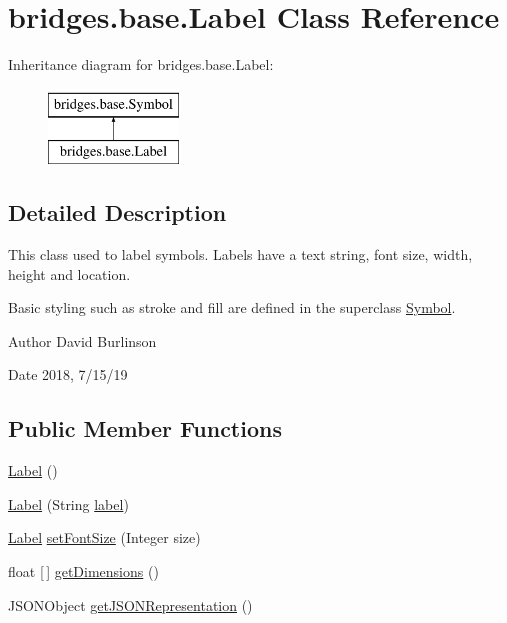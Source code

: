 \hypertarget{classbridges_1_1base_1_1_label}{}\section{bridges.\+base.\+Label Class Reference}
\label{classbridges_1_1base_1_1_label}
Inheritance diagram for bridges.\+base.\+Label\+:\begin{figure}[H]
\begin{center}
\leavevmode
\includegraphics[height=2.000000cm]{classbridges_1_1base_1_1_label}
\end{center}
\end{figure}


\subsection{Detailed Description}
This class used to label symbols. Labels have a text string, font size, width, height and location. 

Basic styling such as stroke and fill are defined in the superclass \mbox{\hyperlink{classbridges_1_1base_1_1_symbol}{Symbol}}.

\begin{DoxyAuthor}{Author}
David Burlinson 
\end{DoxyAuthor}
\begin{DoxyDate}{Date}
2018, 7/15/19 
\end{DoxyDate}
\subsection*{Public Member Functions}
\begin{DoxyCompactItemize}
\item 
\mbox{\hyperlink{classbridges_1_1base_1_1_label_adaed1c29dc02eb0f77d772b256b9eae4}{Label}} ()
\item 
\mbox{\hyperlink{classbridges_1_1base_1_1_label_a0ffb2cdafae3f2c21e0925f2fe23df87}{Label}} (String \mbox{\hyperlink{classbridges_1_1base_1_1_symbol_ad2adcc82e6a96c2f3c465702502655e9}{label}})
\item 
\mbox{\hyperlink{classbridges_1_1base_1_1_label}{Label}} \mbox{\hyperlink{classbridges_1_1base_1_1_label_ab5f2d60e519db2499f326c4ccb967b25}{set\+Font\+Size}} (Integer size)
\item 
float \mbox{[}$\,$\mbox{]} \mbox{\hyperlink{classbridges_1_1base_1_1_label_a476a68af051d561b805babc1d397b031}{get\+Dimensions}} ()
\item 
J\+S\+O\+N\+Object \mbox{\hyperlink{classbridges_1_1base_1_1_label_a6befc6655ce36868213be289571c6315}{get\+J\+S\+O\+N\+Representation}} ()
\end{DoxyCompactItemize}
